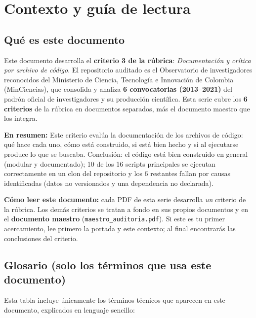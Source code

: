 \section{Contexto y guía de lectura}

\subsection{Qué es este documento}

Este documento desarrolla el \textbf{criterio 3 de la rúbrica}:
\emph{Documentación y crítica por archivo de código}. El repositorio auditado es el
Observatorio de investigadores reconocidos del Ministerio de Ciencia,
Tecnología e Innovación de Colombia (MinCiencias), que consolida y analiza
\textbf{6 convocatorias (2013--2021)} del padrón oficial de investigadores
y su producción científica. Esta serie cubre los \textbf{6 criterios} de la
rúbrica en documentos separados, más el documento maestro que los integra.

\textbf{En resumen:} Este criterio evalúa la documentación de los archivos de código: qué hace cada uno, cómo está construido, si está bien hecho y si al ejecutarse produce lo que se buscaba. Conclusión: el código está bien construido en general (modular y documentado); 10 de los 16 scripts principales se ejecutan correctamente en un clon del repositorio y los 6 restantes fallan por causas identificadas (datos no versionados y una dependencia no declarada).




\begin{tcolorbox}[nota]
\textbf{Cómo leer este documento:} cada PDF de esta serie desarrolla \emph{un}
criterio de la rúbrica. Los demás criterios se tratan a fondo en sus propios
documentos y en el \textbf{documento maestro} (\texttt{maestro\_auditoria.pdf}).
Si este es tu primer acercamiento, lee primero la portada y este contexto; al
final encontrarás las conclusiones del criterio.
\end{tcolorbox}

\subsection{Glosario (solo los términos que usa este documento)}

Esta tabla incluye únicamente los términos técnicos que aparecen en este
documento, explicados en lenguaje sencillo:

